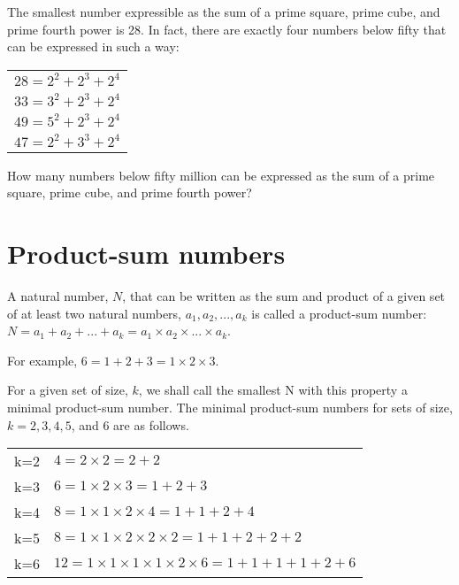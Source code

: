 The smallest number expressible as the sum of a prime square, prime cube, and prime fourth power is 28. In fact, there are exactly four numbers below fifty that can be expressed in such a way:
\begin{center}
    \begin{tabular}{c}
        $28 = 2^2 + 2^3 + 2^4$\\
        $33 = 3^2 + 2^3 + 2^4$\\
        $49 = 5^2 + 2^3 + 2^4$\\
        $47 = 2^2 + 3^3 + 2^4$\\
    \end{tabular}
\end{center}


How many numbers below fifty million can be expressed as the sum of a prime square, prime cube, and prime fourth power?

\section{Product-sum numbers} \label{pb.088}

A natural number, $N$, that can be written as the sum and product of a given set of at least two natural numbers, ${a_1, a_2, ... , a_k}$ is called a product-sum number: $N = a_1 + a_2 + ... + a_k = a_1  \times  a_2  \times  ...  \times  a_k$.

For example, $6 = 1 + 2 + 3 = 1  \times  2  \times  3$.

For a given set of size, $k$, we shall call the smallest N with this property a minimal product-sum number. The minimal product-sum numbers for sets of size, $k = 2, 3, 4, 5$, and $6$ are as follows.

\begin{center}
    \begin{tabular}{c|l}
        k=2 & $4 = 2  \times  2 = 2 + 2$\\
        k=3 & $6 = 1  \times  2  \times  3 = 1 + 2 + 3$\\
        k=4 & $8 = 1  \times  1  \times  2  \times  4 = 1 + 1 + 2 + 4$\\
        k=5 & $8 = 1  \times  1  \times  2  \times  2  \times  2 = 1 + 1 + 2 + 2 + 2$\\
        k=6 & $12 = 1  \times  1  \times  1  \times  1  \times  2  \times  6 = 1 + 1 + 1 + 1 + 2 + 6$\\
    \end{tabular}
\end{center}


